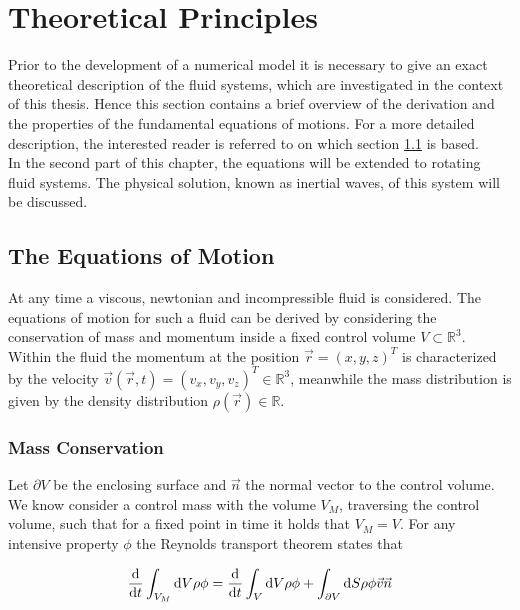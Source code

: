 \chapter{Theoretical Principles}

Prior to the development of a numerical model it is necessary to give an exact theoretical description of the
fluid systems, which are investigated in the context of this thesis.
Hence this section contains a brief overview of the derivation and the properties of the fundamental equations of motions.
For a more detailed description, the interested reader is referred to \citep{ferziger99} on which section \ref{theorie:eqm1} is based.\\
In the second part of this chapter, the equations will be extended to rotating fluid systems.
The physical solution, known as inertial waves, of this system will be discussed.

\section{The Equations of Motion}\label{theorie:eqm1}

At any time a viscous, newtonian and incompressible fluid is considered. The equations of motion for such a fluid can be derived by considering the conservation of
mass and momentum inside a fixed control volume $V \subset \mathbb{R}^3$.
Within the fluid the momentum at the position $\vec{r} = (x, y, z)^T$  is  characterized by the velocity $\vec{v}(\vec{r}, t) = (v_x, v_y, v_z)^T \in \mathbb{R}^3$,
meanwhile the mass distribution is given by the density distribution $\rho(\vec{r}) \in \mathbb{R}$.

\subsection{Mass Conservation}

Let $\partial V$ be the enclosing surface and $\vec{n}$ the normal vector to the control volume.
We know consider a control mass with the volume $V_M$, traversing the control volume, such that for a fixed point in time it holds that $V_M = V$.
For any intensive property $\phi$ the Reynolds transport theorem states that

\begin{align}
    \label{theorie:reynolds}
    \frac{\mathop{}\!\mathrm{d}}{\mathop{}\!\mathrm{d} t} \int_{V_M}\mathop{}\!\mathrm{d} V \rho \phi  = \frac{\mathop{}\!\mathrm{d}}{\mathop{}\!\mathrm{d} t}\int_{V} \mathop{}\!\mathrm{d} V \rho \phi + \int_{\partial V}\mathop{}\!\mathrm{d} S \rho \phi \vec{v} \vec{n}
\end{align}

